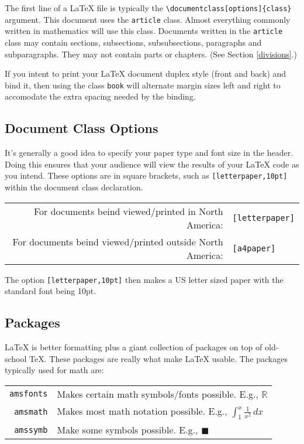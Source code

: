 \documentclass[letterpaper,twoside,10pt]{article}
\begin{document}
The first line of a {\LaTeX} file is typically the \verb!\documentclass[options]{class}! argument.
This document uses the \texttt{article} class. Almost everything commonly written in mathematics
will use this class. Documents written in the \texttt{article} class may contain sections,
subsections, subsubsections, paragraphs and subparagraphs. They may not contain parts or chapters.
(See Section \ref{divisions}.)

\bigbreak If you intent to print your {\LaTeX} document duplex style (front and back) and bind it,
then using the class \texttt{book} will alternate margin sizes left and right to accomodate the
extra spacing needed by the binding.

\subsection{Document Class Options}

It's generally a good idea to specify your paper type and font size in the header. Doing this
ensures that your audience will view the results of your {\LaTeX} code as you intend. These options
are in square brackets, such as \texttt{[letterpaper,10pt]} within the document class declaration.

\begin{center}
 \begin{tabular}{rl}
  \small For documents beind viewed/printed in North America: & \small\texttt{[letterpaper]}\\
  \small For documents beind viewed/printed outside North America: & \small\texttt{[a4paper]}
 \end{tabular}
\end{center}

The option \texttt{[letterpaper,10pt]} then makes a US letter sized paper with the standard font
being 10pt.

\subsection{Packages}

{\LaTeX} is better formatting plus a giant collection of packages on top of old-school {\TeX}. These
packages are really what make {\LaTeX} usable. The packages typically used for math are:

\begin{center}
 \begin{tabular}{rl}
  \small\texttt{amsfonts} & \small Makes certain math symbols/fonts possible. E.g., $\mathbb{R}$\\
  \small\texttt{amsmath} & \small Makes most math notation possible. E.g., $\displaystyle \int_1^x\frac{1}{x^2}\,dx$\\
  \small\texttt{amssymb} & \small Make some symbols possible. E.g., $\blacksquare$
 \end{tabular}
\end{center}
\end{document}
